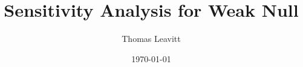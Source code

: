 \documentclass[table, xcolor = {dvipsnames}, 9pt]{beamer}
\title[]{Sensitivity Analysis for Weak Null} %
\author{Thomas Leavitt} %
\institute[Columbia University] %
{
Columbia University \\ %
\medskip
\textit{tl2624@columbia.edu} %
}
\date{\today} %
\theoremstyle{plain}
\begin{document}
\begin{frame}
\titlepage %
\end{frame}


\end{document}
